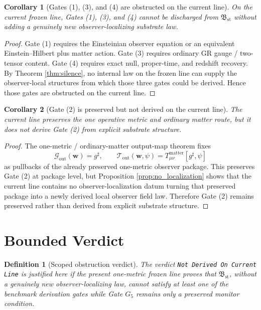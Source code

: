 \documentclass[11pt]{article}
\newcommand{\StableBridgeObject}{\mathfrak B_{\mathrm{st}}}
\newcommand{\FixedMetric}{g^{\sharp}}
\newcommand{\MetricOut}{\mathscr G_{\mathrm{out}}}
\newcommand{\MatterOut}{\mathscr T_{\mathrm{out}}}
\newcommand{\GateFive}{G_{5}}
\newtheorem{definition}{Definition}
\newtheorem{corollary}{Corollary}
\begin{document}
\begin{corollary}[Gates (1), (3), and (4) are obstructed on the current line]
\label{cor:g134}
On the current frozen line, Gates (1), (3), and (4) cannot be discharged from \(\StableBridgeObject\) without adding a genuinely new observer-localizing substrate law.
\end{corollary}

\begin{proof}
Gate (1) requires the Einsteinian observer equation or an equivalent Einstein--Hilbert plus matter action. Gate (3) requires ordinary GR gauge / two-tensor content. Gate (4) requires exact null, proper-time, and redshift recovery. By Theorem \ref{thm:silence}, no internal law on the frozen line can supply the observer-local structures from which those three gates could be derived. Hence those gates are obstructed on the current line.
\end{proof}

\begin{corollary}[Gate (2) is preserved but not derived on the current line]
\label{cor:g2}
The current line preserves the one operative metric and ordinary matter route, but it does not derive Gate (2) from explicit substrate structure.
\end{corollary}

\begin{proof}
The one-metric / ordinary-matter output-map theorem fixes
\[
\MetricOut(\mathbf w)=\FixedMetric,
\qquad
\MatterOut(\mathbf w,\psi)=T_{\mu\nu}^{\mathrm{matter}}[\FixedMetric,\psi]
\]
as pullbacks of the already preserved one-metric observer package. This preserves Gate (2) at package level, but Proposition \ref{prop:no_localization} shows that the current line contains no observer-localization datum turning that preserved package into a newly derived local observer field law. Therefore Gate (2) remains preserved rather than derived from explicit substrate structure.
\end{proof}

\section{Bounded Verdict}

\begin{definition}[Scoped obstruction verdict]
\label{def:verdict}
The verdict \texttt{Not Derived On Current Line} is justified here if the present one-metric frozen line proves that \(\StableBridgeObject\), without a genuinely new observer-localizing law, cannot satisfy at least one of the benchmark derivation gates while Gate \(\GateFive\) remains only a preserved monitor condition.
\end{definition}
\end{document}
